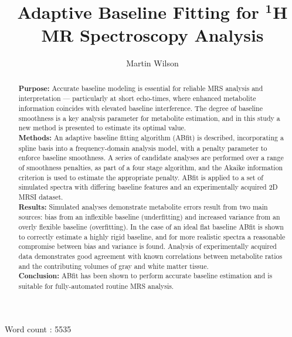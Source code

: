 \documentclass[num-refs]{wiley-article}
\title{Adaptive Baseline Fitting for $^{\textbf{1}}$H MR Spectroscopy Analysis}
\author[1]{Martin Wilson}
\affil[1]{Centre for Human Brain Health and School of Psychology, University of Birmingham, Birmingham, UK.}
\begin{document}
\maketitle

\begin{abstract}
  \textbf{Purpose:} Accurate baseline modeling is essential for reliable MRS analysis and interpretation --- particularly at short echo-times, where enhanced metabolite information coincides with elevated baseline interference. The degree of baseline smoothness is a key analysis parameter for metabolite estimation, and in this study a new method is presented to estimate its optimal value. \\
  \textbf{Methods:} An adaptive baseline fitting algorithm (ABfit) is described, incorporating a spline basis into a frequency-domain analysis model, with a penalty parameter to enforce baseline smoothness. A series of candidate analyses are performed over a range of smoothness penalties, as part of a four stage algorithm, and the Akaike information criterion is used to estimate the appropriate penalty. ABfit is applied to a set of simulated spectra with differing baseline features and an experimentally acquired 2D MRSI dataset. \\
  \textbf{Results:} Simulated analyses demonstrate metabolite errors result from two main sources: bias from an inflexible baseline (underfitting) and increased variance from an overly flexible baseline (overfitting). In the case of an ideal flat baseline ABfit is shown to correctly estimate a highly rigid baseline, and for more realistic spectra a reasonable compromise between bias and variance is found. Analysis of experimentally acquired data demonstrates good agreement with known correlations between metabolite ratios and the contributing volumes of gray and white matter tissue. \\
  \textbf{Conclusion:} ABfit has been shown to perform accurate baseline estimation and is suitable for fully-automated routine MRS analysis.
\end{abstract}

Word count : 5535

\end{document}
